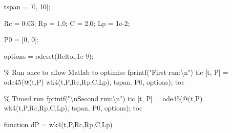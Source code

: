 \documentclass[
  a4paper,
  DIV=11,
  numbers=noendperiod,
  oneside]{scrreprt}
\newenvironment{Shaded}{\begin{snugshade}}{\end{snugshade}}
\newcommand{\CommentTok}[1]{\textcolor[rgb]{0.37,0.37,0.37}{#1}}
\newcommand{\FloatTok}[1]{\textcolor[rgb]{0.68,0.00,0.00}{#1}}
\newcommand{\KeywordTok}[1]{\textcolor[rgb]{0.00,0.23,0.31}{#1}}
\newcommand{\NormalTok}[1]{\textcolor[rgb]{0.00,0.23,0.31}{#1}}
\newcommand{\OperatorTok}[1]{\textcolor[rgb]{0.37,0.37,0.37}{#1}}
\newcommand{\SpecialStringTok}[1]{\textcolor[rgb]{0.13,0.47,0.30}{#1}}
\newcommand{\StringTok}[1]{\textcolor[rgb]{0.13,0.47,0.30}{#1}}
\newcommand{\VariableTok}[1]{\textcolor[rgb]{0.07,0.07,0.07}{#1}}
\begin{document}
\begin{Shaded}
\begin{Highlighting}[]
\VariableTok{tspan} \OperatorTok{=}\NormalTok{ [}\FloatTok{0}\OperatorTok{,} \FloatTok{10}\NormalTok{]}\OperatorTok{;}

\VariableTok{Rc} \OperatorTok{=} \FloatTok{0.03}\OperatorTok{;}
\VariableTok{Rp} \OperatorTok{=} \FloatTok{1.0}\OperatorTok{;}
\VariableTok{C} \OperatorTok{=} \FloatTok{2.0}\OperatorTok{;}
\VariableTok{Lp} \OperatorTok{=} \FloatTok{1e{-}2}\OperatorTok{;}

\VariableTok{P0} \OperatorTok{=}\NormalTok{ [}\FloatTok{0}\OperatorTok{,} \FloatTok{0}\NormalTok{]}\OperatorTok{;}

\VariableTok{options}        \OperatorTok{=} \VariableTok{odeset}\NormalTok{(}\SpecialStringTok{\textquotesingle{}Reltol\textquotesingle{}}\OperatorTok{,}\FloatTok{1e{-}9}\NormalTok{)}\OperatorTok{;}

\CommentTok{\% Run once to allow Matlab to optimise}
\VariableTok{fprintf}\NormalTok{(}\StringTok{"First run:\textbackslash{}n"}\NormalTok{)}
\VariableTok{tic}
\NormalTok{[}\VariableTok{t}\OperatorTok{,} \VariableTok{P}\NormalTok{] }\OperatorTok{=} \VariableTok{ode45}\NormalTok{(}\OperatorTok{@}\NormalTok{(}\VariableTok{t}\OperatorTok{,}\VariableTok{P}\NormalTok{) }\VariableTok{wk4}\NormalTok{(}\VariableTok{t}\OperatorTok{,}\VariableTok{P}\OperatorTok{,}\VariableTok{Rc}\OperatorTok{,}\VariableTok{Rp}\OperatorTok{,}\VariableTok{C}\OperatorTok{,}\VariableTok{Lp}\NormalTok{)}\OperatorTok{,} \VariableTok{tspan}\OperatorTok{,} \VariableTok{P0}\OperatorTok{,} \VariableTok{options}\NormalTok{)}\OperatorTok{;}
\VariableTok{toc}

\CommentTok{\% Timed run}
\VariableTok{fprintf}\NormalTok{(}\StringTok{"\textbackslash{}nSecond run:\textbackslash{}n"}\NormalTok{)}
\VariableTok{tic}
\NormalTok{[}\VariableTok{t}\OperatorTok{,} \VariableTok{P}\NormalTok{] }\OperatorTok{=} \VariableTok{ode45}\NormalTok{(}\OperatorTok{@}\NormalTok{(}\VariableTok{t}\OperatorTok{,}\VariableTok{P}\NormalTok{) }\VariableTok{wk4}\NormalTok{(}\VariableTok{t}\OperatorTok{,}\VariableTok{P}\OperatorTok{,}\VariableTok{Rc}\OperatorTok{,}\VariableTok{Rp}\OperatorTok{,}\VariableTok{C}\OperatorTok{,}\VariableTok{Lp}\NormalTok{)}\OperatorTok{,} \VariableTok{tspan}\OperatorTok{,} \VariableTok{P0}\OperatorTok{,} \VariableTok{options}\NormalTok{)}\OperatorTok{;}
\VariableTok{toc}



\KeywordTok{function} \VariableTok{dP} \OperatorTok{=} \VariableTok{wk4}\NormalTok{(}\VariableTok{t}\OperatorTok{,}\VariableTok{P}\OperatorTok{,}\VariableTok{Rc}\OperatorTok{,}\VariableTok{Rp}\OperatorTok{,}\VariableTok{C}\OperatorTok{,}\VariableTok{Lp}\NormalTok{)}


\end{Highlighting}
\end{Shaded}
\end{document}
